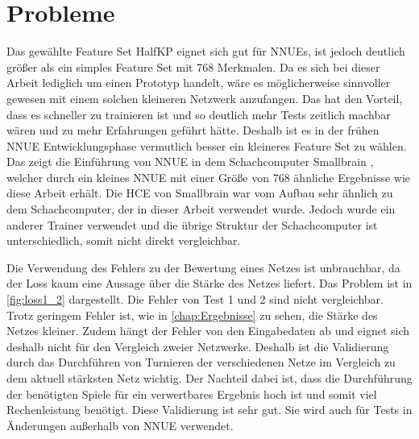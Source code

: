 \section{Probleme}

Das gewählte Feature Set HalfKP eignet sich gut für \acp{NNUE}, ist jedoch deutlich größer als ein simples Feature Set mit 768 Merkmalen. Da es sich bei dieser Arbeit lediglich um einen Prototyp handelt, wäre es möglicherweise sinnvoller gewesen mit einem solchen kleineren Netzwerk anzufangen. Das hat den Vorteil, dass es schneller zu trainieren ist und so deutlich mehr Tests zeitlich machbar wären und zu mehr Erfahrungen geführt hätte. Deshalb ist es in der frühen \ac{NNUE} Entwicklungsphase vermutlich besser ein kleineres Feature Set zu wählen. Das zeigt die Einführung von \ac{NNUE} in dem Schachcomputer Smallbrain \cite{Smallbrain}, welcher durch ein kleines \ac{NNUE} mit einer Größe von 768 ähnliche Ergebnisse wie diese Arbeit erhält. Die \ac{HCE} von Smallbrain war vom Aufbau sehr ähnlich zu dem Schachcomputer, der in dieser Arbeit verwendet wurde. Jedoch wurde ein anderer Trainer verwendet und die übrige Struktur der Schachcomputer ist unterschiedlich, somit nicht direkt vergleichbar.

Die Verwendung des Fehlers zu der Bewertung eines Netzes ist unbrauchbar, da der Loss kaum eine Aussage über die Stärke des Netzes liefert. Das Problem ist in \autoref{fig:loss1_2} dargestellt. Die Fehler von Test 1 und 2 sind nicht vergleichbar. Trotz geringem Fehler ist, wie in \autoref{chap:Ergebnisse} zu sehen, die Stärke des Netzes kleiner. Zudem hängt der Fehler von den Eingabedaten ab und eignet sich deshalb nicht für den Vergleich zweier Netzwerke. Deshalb ist die Validierung durch das Durchführen von Turnieren der verschiedenen Netze im Vergleich zu dem aktuell stärksten Netz wichtig. Der Nachteil dabei ist, dass die Durchführung der benötigten Spiele für ein verwertbares Ergebnis hoch ist und somit viel Rechenleistung benötigt. Diese Validierung ist sehr gut. Sie wird auch für Tests in Änderungen außerhalb von \ac{NNUE} verwendet.

